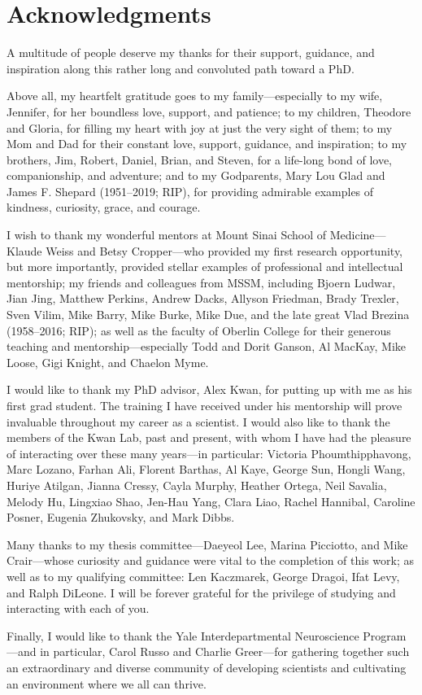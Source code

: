 \chapter*{Acknowledgments}

A multitude of people deserve my thanks for their support, guidance, and inspiration along this rather long and convoluted path toward a PhD.

Above all, my heartfelt gratitude goes to my family---especially to my wife, Jennifer, for her boundless love, support, and patience; to my children, Theodore and Gloria, for filling my heart with joy at just the very sight of them; to my Mom and Dad for their constant love, support, guidance, and inspiration; to my brothers, Jim, Robert, Daniel, Brian, and Steven, for a life-long bond of love, companionship, and adventure; and to my Godparents, Mary Lou Glad and James F. Shepard (1951--2019; RIP), for providing admirable examples of kindness, curiosity, grace, and courage. 

I wish to thank my wonderful mentors at Mount Sinai School of Medicine---Klaude Weiss and Betsy Cropper---who provided my first research opportunity, but more importantly, provided stellar examples of professional and intellectual mentorship; my friends and colleagues from MSSM, including Bjoern Ludwar, Jian Jing, Matthew Perkins, Andrew Dacks, Allyson Friedman, Brady Trexler, Sven Vilim, Mike Barry, Mike Burke, Mike Due, and the late great Vlad Brezina (1958--2016; RIP); as well as the faculty of Oberlin College for their generous teaching and mentorship---especially Todd and Dorit Ganson, Al MacKay, Mike Loose, Gigi Knight, and Chaelon Myme. 

I would like to thank my PhD advisor, Alex Kwan, for putting up with me as his first grad student. The training I have received under his mentorship will prove invaluable throughout my career as a scientist. I would also like to thank the members of the Kwan Lab, past and present, with whom I have had the pleasure of interacting over these many years---in particular: Victoria Phoumthipphavong, Marc Lozano, Farhan Ali, Florent Barthas, Al Kaye, George Sun, Hongli Wang, Huriye Atilgan, Jianna Cressy, Cayla Murphy, Heather Ortega, Neil Savalia, Melody Hu, Lingxiao Shao, Jen-Hau Yang, Clara Liao, Rachel Hannibal, Caroline Posner, Eugenia Zhukovsky, and Mark Dibbs. 

Many thanks to my thesis committee---Daeyeol Lee, Marina Picciotto, and Mike Crair---whose curiosity and guidance were vital to the completion of this work; as well as to my qualifying committee: Len Kaczmarek, George Dragoi, Ifat Levy, and Ralph DiLeone. I will be forever grateful for the privilege of studying and interacting with each of you.

Finally, I would like to thank the Yale Interdepartmental Neuroscience Program---and in particular, Carol Russo and Charlie Greer---for gathering together such an extraordinary and diverse community of developing scientists and cultivating an environment where we all can thrive.  